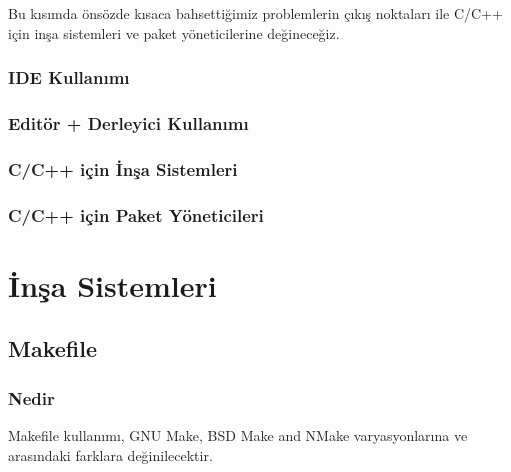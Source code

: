 \documentclass[
]{book}
\begin{document}
Bu kısımda önsözde kısaca bahsettiğimiz problemlerin çıkış noktaları ile C/C++ için inşa sistemleri ve paket yöneticilerine değineceğiz.

\hypertarget{ide-kullanux131mux131}{%
\section*{IDE Kullanımı}\label{ide-kullanux131mux131}}

\hypertarget{edituxf6r-derleyici-kullanux131mux131}{%
\section*{Editör + Derleyici Kullanımı}\label{edituxf6r-derleyici-kullanux131mux131}}

\hypertarget{cc-iuxe7in-inux15fa-sistemleri}{%
\section*{C/C++ için İnşa Sistemleri}\label{cc-iuxe7in-inux15fa-sistemleri}}

\hypertarget{cc-iuxe7in-paket-yuxf6neticileri}{%
\section*{C/C++ için Paket Yöneticileri}\label{cc-iuxe7in-paket-yuxf6neticileri}}

\hypertarget{part-inux15fa-sistemleri}{%
\part{İnşa Sistemleri}\label{part-inux15fa-sistemleri}}

\hypertarget{makefile}{%
\chapter*{Makefile}\label{makefile}}

\hypertarget{nedir}{%
\section*{Nedir}\label{nedir}}

Makefile kullanımı, GNU Make, BSD Make and NMake varyasyonlarına ve arasındaki farklara değinilecektir.
\end{document}
